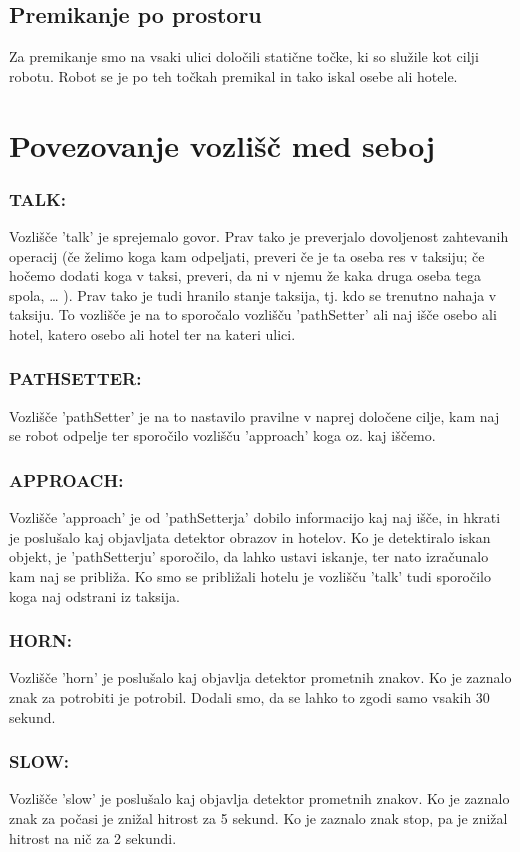 \documentclass{llncs}
\begin{document}
\subsection{Premikanje po prostoru}
Za premikanje smo na vsaki ulici določili statične točke, ki so služile kot cilji robotu. Robot se je po teh točkah premikal in tako iskal osebe ali hotele.

\section{Povezovanje vozlišč med seboj}

\subsubsection{TALK:} Vozlišče 'talk' je sprejemalo govor. Prav tako je preverjalo dovoljenost zahtevanih operacij (če želimo koga kam odpeljati, preveri če je ta oseba res v taksiju; če hočemo dodati koga v taksi, preveri, da ni v njemu že kaka druga oseba tega spola, … ). Prav tako je tudi hranilo stanje taksija, tj. kdo se trenutno nahaja v taksiju. To vozlišče je na to sporočalo vozlišču 'pathSetter' ali naj išče osebo ali hotel, katero osebo ali hotel ter na kateri ulici.
\subsubsection{PATHSETTER:} Vozlišče 'pathSetter' je na to nastavilo pravilne v naprej določene cilje, kam naj se robot odpelje ter sporočilo vozlišču 'approach' koga oz. kaj iščemo.
\subsubsection{APPROACH:} Vozlišče 'approach' je od 'pathSetterja' dobilo informacijo kaj naj išče, in hkrati je poslušalo kaj objavljata detektor obrazov in hotelov. Ko je detektiralo iskan objekt, je 'pathSetterju' sporočilo, da lahko ustavi iskanje, ter nato izračunalo kam naj se približa. Ko smo se približali hotelu je vozlišču 'talk' tudi sporočilo koga naj odstrani iz taksija.
\subsubsection{HORN:} Vozlišče 'horn' je poslušalo kaj objavlja detektor prometnih znakov. Ko je zaznalo znak za potrobiti je potrobil. Dodali smo, da se lahko to zgodi samo vsakih 30 sekund.
\subsubsection{SLOW:} Vozlišče 'slow' je poslušalo kaj objavlja detektor prometnih znakov. Ko je zaznalo znak za počasi je znižal hitrost za 5 sekund. Ko je zaznalo znak stop, pa je znižal hitrost na nič za 2 sekundi.
\end{document}
